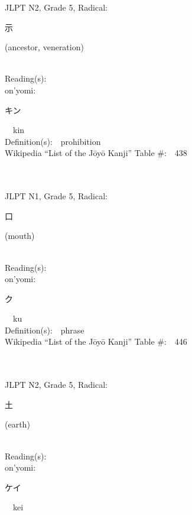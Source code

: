 \begin{multicols}{2}
{JLPT N2, Grade 5, Radical:\ \ {\begin{CJK}{UTF8}{min} 示 \end{CJK}} (ancestor, veneration) } \\
Reading(s):\ \ \\
{\hspace*{1em}}on'yomi:\ \ \\
{\hspace*{2em}}{\begin{CJK}{UTF8}{min} キン \end{CJK}}\ \ kin\ \ \\
Definition(s):\ \ prohibition \\
Wikipedia ``List of the J\=oy\=o Kanji'' Table \#:\ \ 438 \\
\ \ \\
{\fontsize{34pt}{40pt}  }\ \ \\  %
{JLPT N1, Grade 5, Radical:\ \ {\begin{CJK}{UTF8}{min} 口 \end{CJK}} (mouth) } \\
Reading(s):\ \ \\
{\hspace*{1em}}on'yomi:\ \ \\
{\hspace*{2em}}{\begin{CJK}{UTF8}{min} ク \end{CJK}}\ \ ku\ \ \\
Definition(s):\ \ phrase \\
Wikipedia ``List of the J\=oy\=o Kanji'' Table \#:\ \ 446 \\
\ \ \\
{\fontsize{34pt}{40pt}  }\ \ \\  %
{JLPT N2, Grade 5, Radical:\ \ {\begin{CJK}{UTF8}{min} 土 \end{CJK}} (earth) } \\
Reading(s):\ \ \\
{\hspace*{1em}}on'yomi:\ \ \\
{\hspace*{2em}}{\begin{CJK}{UTF8}{min} ケイ \end{CJK}}\ \ kei\ \ \\

\end{multicols}
